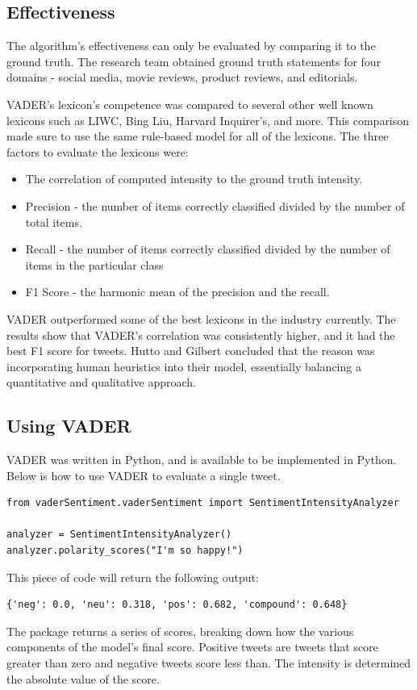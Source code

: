 \documentclass[11pt, twoside, reqno]{book}
\begin{document}
\subsection{Effectiveness}
\hspace{0.2in} The algorithm's effectiveness can only be evaluated by comparing it to the ground truth. The research team obtained ground truth statements for four domains - social media, movie reviews, product reviews, and editorials. 

VADER's lexicon's competence was compared to several other well known lexicons such as LIWC, Bing Liu, Harvard Inquirer's, and more. This comparison made sure to use the same rule-based model for all of the lexicons. The three factors to evaluate the lexicons were:
\begin{itemize}
	\item The correlation of computed intensity to the ground truth intensity. 
	\item Precision - the number of items correctly classified divided by the number of total items. 
	\item Recall - the number of items correctly classified divided by the number of items in the particular class
	\item F1 Score - the harmonic mean of the precision and the recall.
\end{itemize}

VADER outperformed some of the best lexicons in the industry currently. The results show that VADER's correlation was consistently higher, and it had the best F1 score for tweets. Hutto and Gilbert concluded that the reason was incorporating human heuristics into their model, essentially balancing a quantitative and qualitative approach. 

\subsection{Using VADER}
\hspace{0.2in}VADER was written in Python, and is available to be implemented in Python. Below is how to use VADER to evaluate a single tweet. 
\begin{verbatim}
from vaderSentiment.vaderSentiment import SentimentIntensityAnalyzer

analyzer = SentimentIntensityAnalyzer()
analyzer.polarity_scores("I'm so happy!")
\end{verbatim}
This piece of code will return the following output:
\begin{verbatim}
{'neg': 0.0, 'neu': 0.318, 'pos': 0.682, 'compound': 0.648}
\end{verbatim}
The package returns a series of scores, breaking down how the various components of the model's final score. Positive tweets are tweets that score greater than zero and negative tweets score less than. The intensity is determined the absolute value of the score. 
\end{document}
